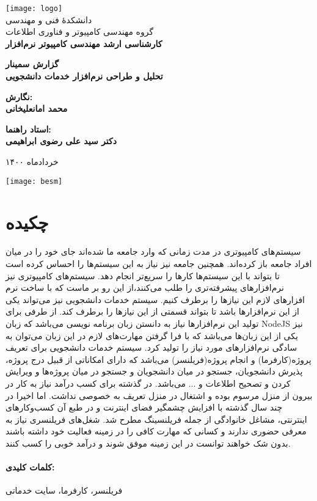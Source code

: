 
\begin{titlepage}
	\centering
	\texttt{[image: logo]}
	\\[10pt]
	{\Large
		دانشکدۀ ‫فنی و مهندسی
		\\[10pt]
		گروه ‫مهندسی کامپیوتر و فناوری اطلاعات
		\\[15pt] \bfseries
		کارشناسی ارشد مهندسی کامپیوتر نرم‌افزار
	‬‫‬‬}

	\vfill
	{\Large \bfseries 
		گزارش سمینار
	} \\[10pt]
	{\huge	\bfseries
			تحلیل و طراحی نرم‌افزار خدمات دانشجویی
	}

	\vfill
	{\large \bfseries
	نگارش:
	\\[10pt]
	محمد  امانعلیخانی
	}

	\vfill
	{\large \bfseries
			استاد راهنما:
			\\[10pt]
			دکتر سید علی رضوی ابراهیمی
	}

	\vfill
	{\large خرداد‌ماه ۱۴۰۰}
	
	
	
\end{titlepage}


\thispagestyle{empty}
\begin{minipage}[c][\textheight][c]{\textwidth}%
	\centering
	\texttt{[image: besm]}
\end{minipage}%

\section*{چکیده}
سیستم‌های کامپیوتری در مدت زمانی که وارد جامعه ما شده‌اند جای خود را در میان افراد جامعه باز کرده‌اند.
همچنین جامعه نیز نیاز به این سیستم‌ها را احساس کرده است تا بتواند با این  سیستم‌ها  کارها را سریع‌تر انجام دهد.
سیستم‌های کامپیوتری نیز نرم‌افزارهای پیشرفته‌تری را طلب می‌کنند،از این رو بر ماست که با ساخت نرم افزارهای لازم این نیازها را برطرف کنیم.
سیستم خدمات دانشجویی نیز می‌تواند یکی از این نرم‌افزارها باشد تا بتواند قسمتی از این نیازها را برطرف کند.
از طرفی برای تولید این نرم‌افزارها نیاز به دانستن زبان‌ برنامه نویسی می‌باشد که زبان NodeJS نیز یکی از این زبان‌ها می‌باشد که با فرا گرفتن مهارت‌های لازم در این زبان می‌توان به سادگی نرم‌افزارهای مورد نیاز را تولید کرد.
سیستم خدمات دانشجویی برای تعریف پروژه(کارفرما) و انجام پروژه(فریلنسر) می‌باشد که دارای امکاناتی از قبیل درج پروژه، پذیرش دانشجویان، جستجو در میان دانشجویان و جستجو در میان پروژه‌ها و ویرایش کردن و تصحیح اطلاعات و ... می‌باشد.
در گذشته برای کسب درآمد نیاز به کار در بیرون از منزل مرسوم بوده و اشتغال در منزل تعریف به خصوصی نداشت.
اما اخیرا در چند سال گذشته با افزایش چشمگیر فضای اینترنت و در طبع آن کسب‌وکارهای اینترنتی، مشاغل خانوادگی از جمله فریلنسینگ مطرح شد.
شغل‌های فریلنسری نیاز به معرفی حضوری ندارند و کسانی که مهارت کافی را در زمینه فعالیت خود داشته باشند بدون شک خواهند توانست در این زمینه موفق شوند و درآمد خوبی را کسب کنند.
\paragraph{کلمات کلیدی:}
فریلنسر، کارفرما، سایت خدماتی

\thispagestyle{empty}
\pagestyle{plain}
\setcounter{page}{1}
\clearpage








 
 
 
